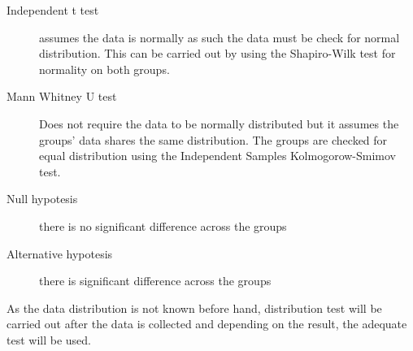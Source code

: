 \begin{description}
	\item[Independent t test] assumes the data is normally as such the data must be check for normal distribution. This can be carried out by using the Shapiro-Wilk\cite{de2015statsref} test for normality on both groups.
	
	\item[Mann Whitney U test] Does not require the data to be normally distributed but it assumes the groups' data shares the same distribution. The groups are checked for equal distribution using the Independent Samples Kolmogorow-Smimov test.
	
	\item[Null hypotesis]there is no significant difference across the groups
	\item[Alternative hypotesis]there is significant difference across the groups
\end{description}

As the data distribution is not known before hand, distribution test will be carried out after the data is collected and depending on the result, the adequate test will be used.
